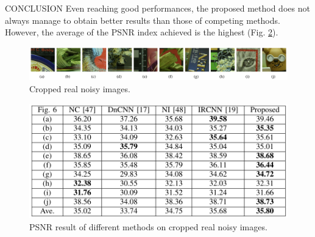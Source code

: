 \begin{frame}{CONCLUSION}
    Even reaching good performances, the proposed method does not always 
    manage to obtain better results than those of competing methods. 
    However, the average of the PSNR index achieved is the highest (Fig. \ref{fig:cropRes}).
    \begin{figure}[h!]
        \centering
        \includegraphics[width = \linewidth]{images/paper7/crop.png}
        \centering
        \caption{Cropped real noisy images.}
        \label{fig:crop}
    \end{figure}
    
    \begin{figure}[h!]
        \centering
        \includegraphics[width = 0.7\linewidth]{images/paper7/crop result.png}
        \centering
        \caption{PSNR result of different methods on cropped real noisy images.}
        \label{fig:cropRes}
    \end{figure}
    
\end{frame}


